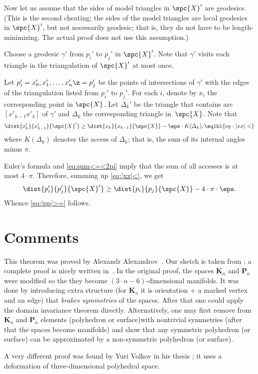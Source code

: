 Now let us assume that the sides of model triangles in $\spc{X}'$ are geodesics.
(This is the second cheating; the sides of the model triangles are local geodesics in $\spc{X}'$,
but not necessarily geodesic; that is, they do not have to be length-minimizing.
The actual proof does not use this assumption.)

Choose a geodesic $\gamma'$ from $p_i'$ to $p_j'$ in $\spc{X}'$.
Note that $\gamma'$ visits each triangle in the triangulation of $\spc{X}'$ at most once.

Let $p_i'=x_0',x_1',\dots,x_n'\z=p_j'$ be the points of intersections of $\gamma'$ with the edges of the triangulation listed from $p_i'$ to $p_j'$.
For each $i$, denote by $x_i$ the corresponding point in $\spc{X}$.
Let $\Delta_k'$ be the triangle that contains arc $[x'_{k-1}x'_k]$ of $\gamma'$ and $\Delta_k$ the corresponding triangle in~$\spc{X}$.
Note that
\[\dist{x_k'}{x_{k-1}'}{\spc{X}'}
\ge
\dist{x_k}{x_{k-1}}{\spc{X}} -\eps\cdot K(\Delta_k),
\eqlbl{eq:|xx|<}\]
where $K(\Delta_k)$ denotes the access of $\Delta_k$;
that is, the sum of its internal angles minus $\pi$.

Euler's formula and \ref{eq:sum<=<2pi} imply that the sum of all accesses is at most $4\cdot\pi$.
Therefore, summing up \ref{eq:|xx|<}, we get
\[\dist{p_i'}{p_j'}{\spc{X}'}
\ge
\dist{p_i}{p_j}{\spc{X}}-4\cdot \pi\cdot \eps.\]
Whence \ref{eq:|pp|>=} follows.
\qeds

\section{Comments}

This theorem was proved by Alexandr Alexandrov~\cite{alexandrov-1941}.
Our sketch is taken from \cite{lebedeva-petrunin};
a complete proof is nicely written in~\cite{alexandrov}.
In the original proof, the spaces $\mathbf{K}_n$ and $\mathbf{P}_n$ were modified so the they become $(3\cdot n-6)$-dimensional manifolds.
It was done by introducing extra structure (for $\mathbf{K}_n$ it is orientation + a marked vertex and an edge) that \textit{brakes symmetries} of the spaces.
After that one could apply the domain invariance theorem directly.
Alternatively, one may first remove from $\mathbf{K}_n$ and $\mathbf{P}_n$ elements (polyhedron or surface)with nontrivial symmetries (after that the spaces become manifolds) and show that any symmetric polyhedron (or surface) can be approximated by a non-symmetric polyhedron (or surface).

A very different proof was found by Yuri Volkov in his thesis \cite{volkov};
it uses a deformation of three-dimensional polyhedral space.

